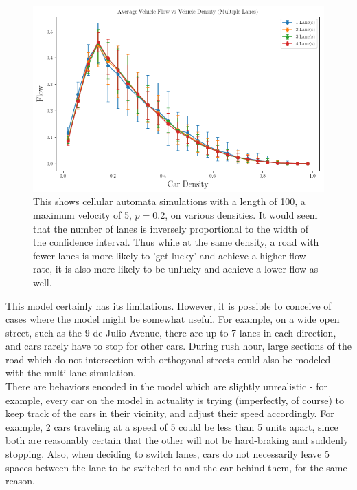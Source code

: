 \documentclass{article}
\begin{document}
\begin{figure}[h]
\centering
\includegraphics[scale = 0.6]{multilanemultiflow.png}
\caption{This shows cellular automata simulations with a length of 100, a maximum velocity of 5, $p = 0.2$, on various densities. It would seem that the number of lanes is inversely proportional to the width of the confidence interval. Thus while at the same density, a road with fewer lanes is more likely to 'get lucky' and achieve a higher flow rate, it is also more likely to be unlucky and achieve a lower flow as well.}
\end{figure}

This model certainly has its limitations. However, it is possible to conceive of cases where the model might be somewhat useful. For example, on a wide open street, such as the 9 de Julio Avenue, there are up to 7 lanes in each direction, and cars rarely have to stop for other cars. During rush hour, large sections of the road which do not intersection with orthogonal streets could also be modeled with the multi-lane simulation. \\


There are behaviors encoded in the model which are slightly unrealistic - for example, every car on the model in actuality is trying (imperfectly, of course) to keep track of the cars in their vicinity, and adjust their speed accordingly. For example, 2 cars traveling at a speed of 5 could be less than 5 units apart, since both are reasonably certain that the other will not be hard-braking and suddenly stopping. Also, when deciding to switch lanes, cars do not necessarily leave 5 spaces between the lane to be switched to and the car behind them, for the same reason.\\
\end{document}
